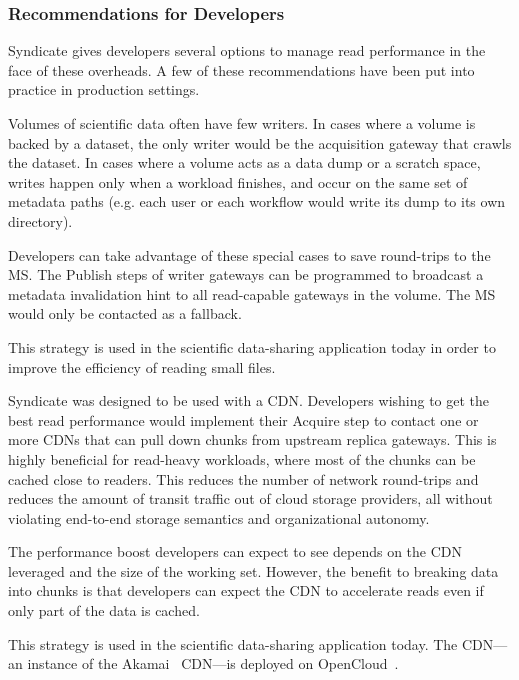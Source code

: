 \subsubsection{Recommendations for Developers}

Syndicate gives developers several options to manage read performance in the
face of these overheads.  A few of these recommendations have been put into
practice in production settings.

\hfill \break
{}
\hfill \break

Volumes of scientific data often have few writers.  In cases where a volume is
backed by a dataset, the only writer would be the acquisition gateway that
crawls the dataset.  In cases where a volume acts as a data dump or a scratch space,
writes happen only when a workload finishes, and occur on the same set of
metadata paths (e.g. each user or each workflow would write its dump to its own
directory).

Developers can take advantage of these special cases to save round-trips to the MS.
The Publish steps of writer gateways can be programmed to 
broadcast a metadata invalidation hint to all read-capable gateways in the
volume.  The MS would only be contacted as a fallback.

This strategy is used in the scientific data-sharing application today in order
to improve the efficiency of reading small files.

\hfill \break
{}
\hfill \break

Syndicate was designed to be used with a CDN.  Developers wishing to get the
best read performance would implement their Acquire step to contact one or more
CDNs that can pull down chunks from upstream replica gateways.  This is highly
beneficial for read-heavy workloads, where most of the chunks can be cached
close to readers.  This reduces the number of network round-trips and reduces
the amount of transit traffic out of cloud storage providers, all without
violating end-to-end storage semantics and organizational autonomy.

The performance boost developers can expect to see depends on the CDN leveraged
and the size of the working set.
However, the benefit to breaking data into chunks is that
developers can expect the CDN to accelerate reads even if only
part of the data is cached.

This strategy is used in the scientific data-sharing application today.  The
CDN---an instance of the Akamai~\cite{akamai} CDN---is deployed on OpenCloud~\cite{opencloud}.

